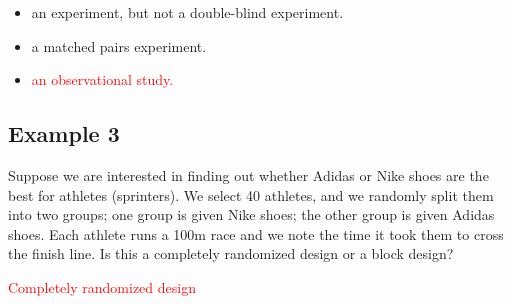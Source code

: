 \begin{itemize}
    \item an experiment, but not a double-blind experiment.
    \item a matched pairs experiment.
    \item \textcolor{red}{an observational study.}
\end{itemize}

\subsection*{Example 3}

Suppose we are interested in finding out whether Adidas or Nike shoes are the best for athletes (sprinters). We select 40 athletes, and we randomly split them into two groups; one group is given Nike shoes; the other group is given Adidas shoes. Each athlete runs a 100m race and we note the time it took them to cross the finish line. Is this a completely randomized design or a block design?

\textcolor{red}{Completely randomized design}